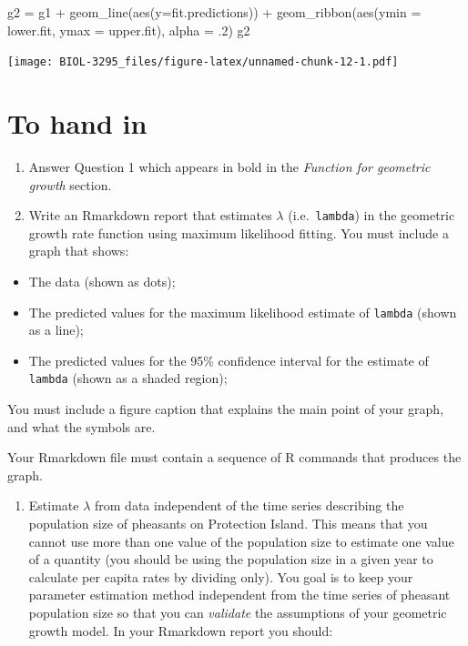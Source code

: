 \documentclass[
]{book}
\newenvironment{Shaded}{\begin{snugshade}}{\end{snugshade}}
\newcommand{\AttributeTok}[1]{\textcolor[rgb]{0.77,0.63,0.00}{#1}}
\newcommand{\DecValTok}[1]{\textcolor[rgb]{0.00,0.00,0.81}{#1}}
\newcommand{\FunctionTok}[1]{\textcolor[rgb]{0.00,0.00,0.00}{#1}}
\newcommand{\NormalTok}[1]{#1}
\newcommand{\OtherTok}[1]{\textcolor[rgb]{0.56,0.35,0.01}{#1}}
\newcommand{\SpecialCharTok}[1]{\textcolor[rgb]{0.00,0.00,0.00}{#1}}
\providecommand{\tightlist}{%
  \setlength{\itemsep}{0pt}\setlength{\parskip}{0pt}}
\begin{document}
\begin{Shaded}
\begin{Highlighting}[]
\NormalTok{g2 }\OtherTok{=}\NormalTok{ g1 }\SpecialCharTok{+}
  \FunctionTok{geom\_line}\NormalTok{(}\FunctionTok{aes}\NormalTok{(}\AttributeTok{y=}\NormalTok{fit.predictions)) }\SpecialCharTok{+}
  \FunctionTok{geom\_ribbon}\NormalTok{(}\FunctionTok{aes}\NormalTok{(}\AttributeTok{ymin =}\NormalTok{ lower.fit, }\AttributeTok{ymax =}\NormalTok{ upper.fit), }\AttributeTok{alpha =}\NormalTok{ .}\DecValTok{2}\NormalTok{)}
\NormalTok{g2}
\end{Highlighting}
\end{Shaded}

\texttt{[image: BIOL-3295\_files/figure-latex/unnamed-chunk-12-1.pdf]}

\hypertarget{to-hand-in}{%
\section{To hand in}\label{to-hand-in}}

\begin{enumerate}
\def\labelenumi{\arabic{enumi}.}
\item
  Answer Question 1 which appears in bold in the \emph{Function for geometric growth} section.
\item
  Write an Rmarkdown report that estimates \(\lambda\) (i.e.~\texttt{lambda}) in the geometric growth rate function using maximum likelihood fitting.
  You must include a graph that shows:
\end{enumerate}

\begin{itemize}
\tightlist
\item
  The data (shown as dots);
\item
  The predicted values for the maximum likelihood estimate of \texttt{lambda} (shown as a line);
\item
  The predicted values for the 95\% confidence interval for the estimate of \texttt{lambda} (shown as a shaded region);
\end{itemize}

You must include a figure caption that explains the main point of your graph, and what the symbols are.

Your Rmarkdown file must contain a sequence of R commands that produces the graph.

\begin{enumerate}
\def\labelenumi{\arabic{enumi}.}
\setcounter{enumi}{2}
\tightlist
\item
  Estimate \(\lambda\) from data independent of the time series describing the population size of pheasants on Protection Island. This means that you cannot use more than one value of the population size to estimate one value of a quantity (you should be using the population size in a given year to calculate per capita rates by dividing only). You goal is to keep your parameter estimation method independent from the time series of pheasant population size so that you can \emph{validate} the assumptions of your geometric growth model. In your Rmarkdown report you should:
\end{enumerate}
\end{document}
